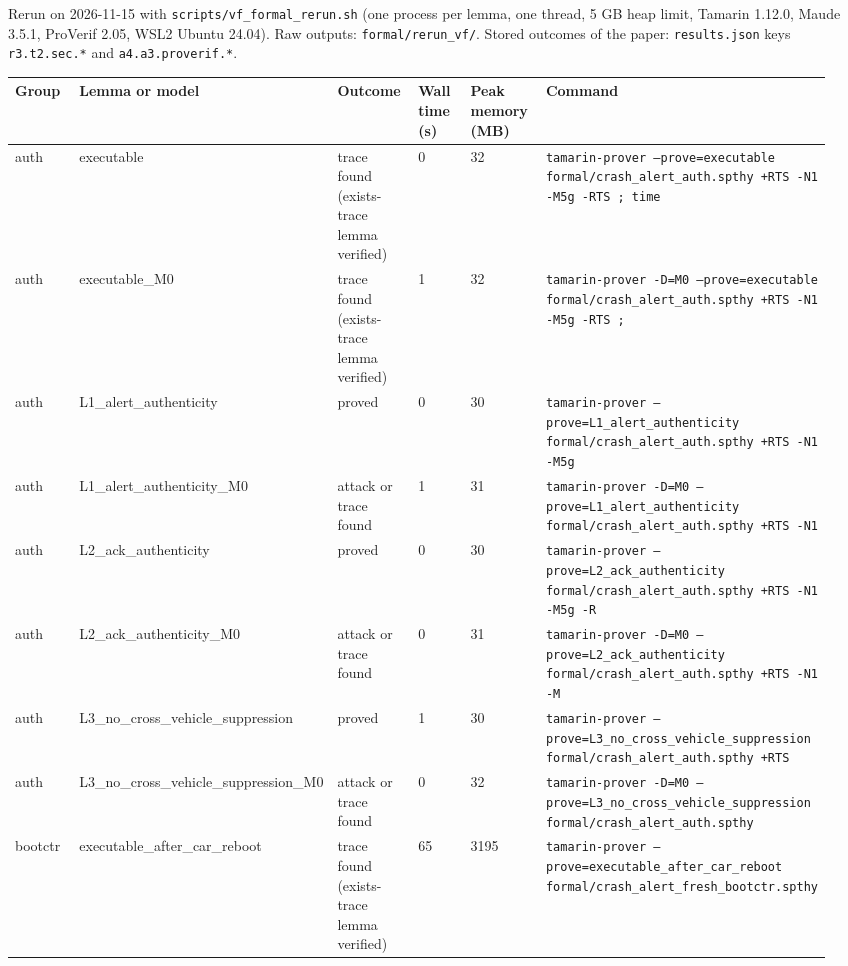 


Rerun on 2026-11-15 with \texttt{scripts/vf\_formal\_rerun.sh} (one process per lemma, one thread, 5 GB heap limit, Tamarin 1.12.0, Maude 3.5.1, ProVerif 2.05, WSL2 Ubuntu 24.04). Raw outputs: \texttt{formal/rerun\_vf/}. Stored outcomes of the paper: \texttt{results.json} keys \texttt{r3.t2.sec.*} and \texttt{a4.a3.proverif.*}.

{\scriptsize\raggedright
\begin{longtable}{p{0.158\linewidth}p{0.158\linewidth}p{0.158\linewidth}p{0.158\linewidth}p{0.158\linewidth}p{0.158\linewidth}}
\toprule
Group & Lemma or model & Outcome & Wall time (s) & Peak memory (MB) & Command \\
\midrule
\endhead
auth & executable & trace found (exists-trace lemma verified) & 0 & 32 & \texttt{tamarin-prover  --prove=executable formal/crash\_alert\_auth.spthy +RTS -N1 -M5g -RTS ; time} \\
auth & executable\_M0 & trace found (exists-trace lemma verified) & 1 & 32 & \texttt{tamarin-prover -D=M0 --prove=executable formal/crash\_alert\_auth.spthy +RTS -N1 -M5g -RTS ;} \\
auth & L1\_alert\_authenticity & proved & 0 & 30 & \texttt{tamarin-prover  --prove=L1\_alert\_authenticity formal/crash\_alert\_auth.spthy +RTS -N1 -M5g } \\
auth & L1\_alert\_authenticity\_M0 & attack or trace found & 1 & 31 & \texttt{tamarin-prover -D=M0 --prove=L1\_alert\_authenticity formal/crash\_alert\_auth.spthy +RTS -N1 } \\
auth & L2\_ack\_authenticity & proved & 0 & 30 & \texttt{tamarin-prover  --prove=L2\_ack\_authenticity formal/crash\_alert\_auth.spthy +RTS -N1 -M5g -R} \\
auth & L2\_ack\_authenticity\_M0 & attack or trace found & 0 & 31 & \texttt{tamarin-prover -D=M0 --prove=L2\_ack\_authenticity formal/crash\_alert\_auth.spthy +RTS -N1 -M} \\
auth & L3\_no\_cross\_vehicle\_suppression & proved & 1 & 30 & \texttt{tamarin-prover  --prove=L3\_no\_cross\_vehicle\_suppression formal/crash\_alert\_auth.spthy +RTS} \\
auth & L3\_no\_cross\_vehicle\_suppression\_M0 & attack or trace found & 0 & 32 & \texttt{tamarin-prover -D=M0 --prove=L3\_no\_cross\_vehicle\_suppression formal/crash\_alert\_auth.spthy} \\
bootctr & executable\_after\_car\_reboot & trace found (exists-trace lemma verified) & 65 & 3195 & \texttt{tamarin-prover  --prove=executable\_after\_car\_reboot formal/crash\_alert\_fresh\_bootctr.spthy} \\

\end{longtable}}
